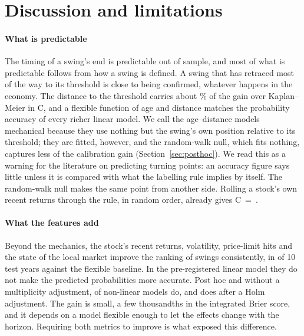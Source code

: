 \section{Discussion and limitations}\label{sec:discussion}

\paragraph{What is predictable} The timing of a swing's end is predictable out of sample, and most
of what is predictable follows from how a swing is defined. A swing that has retraced most of the
way to its threshold is close to being confirmed, whatever happens in the economy. The distance to
the threshold carries about \MechShareDIST\% of the gain over Kaplan--Meier in C, and a flexible function of
age and distance matches the probability accuracy of every richer linear model. We call the
age--distance models mechanical because they use nothing but the swing's own position relative to
its threshold; they are fitted, however, and the random-walk null, which fits nothing, captures less
of the calibration gain (Section~\ref{sec:posthoc}). We read this as a
warning for the literature on predicting turning points: an accuracy figure says little unless it
is compared with what the labelling rule implies by itself. The random-walk null makes the same
point from another side. Rolling a stock's own recent returns through the rule, in random order,
already gives C~=~\CRW.

\paragraph{What the features add} Beyond the mechanics, the stock's recent returns, volatility,
price-limit hits and the state of the local market improve the ranking of swings consistently,
in \YearsAboveABCxMFlex{} of 10 test years against the flexible baseline. In the pre-registered
linear model they do not make the predicted probabilities more accurate. Post hoc and without a
multiplicity adjustment, \PHLikePass{} of \PHLikeCount{} non-linear models do, and \PHHolmPass{}
does after a Holm adjustment. The gain is small, a few thousandths in
the integrated Brier score, and it depends on a model flexible enough to let the effects change
with the horizon. Requiring both metrics to improve is what exposed this difference.

